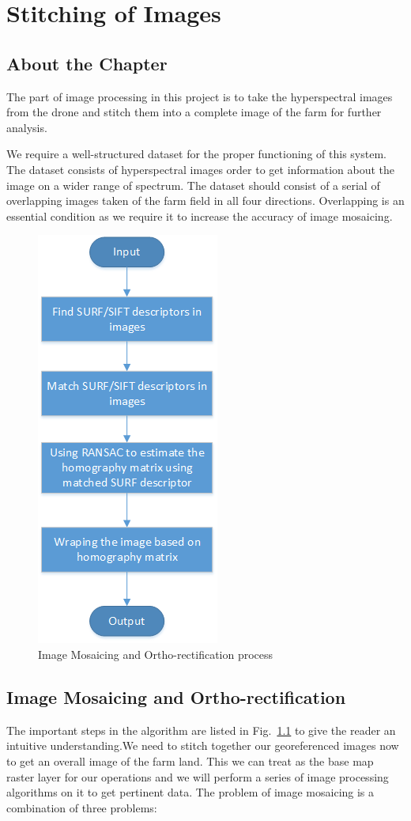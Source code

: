 \chapter{Stitching of Images}

\section{About the Chapter}

The part of image processing in this project is to take the hyperspectral images from the drone and stitch them into a complete image of the farm for further analysis.

We require a well-structured dataset for the proper functioning of this system. The dataset consists of hyperspectral images order to get information about the image on a wider range of spectrum. The dataset should consist of a serial of overlapping images taken of the farm field in all four directions. Overlapping is an essential condition as we require it to increase the accuracy of image mosaicing. 



\begin{figure}[t]
	\includegraphics[height=0.9\linewidth]{extra-4}
	\centering
	\caption{\label{fig: extra-4}Image Mosaicing and Ortho-rectification process}
\end{figure}


\section{Image Mosaicing and Ortho-rectification}
The important steps in the algorithm are listed in Fig.~\ref{fig: extra-4} to give the reader an intuitive understanding.We need to stitch together our georeferenced images now to get an overall image of the farm land. This we can treat as the base map raster layer for our operations and we will perform a series of image processing algorithms on it to get pertinent data. The problem of image mosaicing is a combination of three problems:

